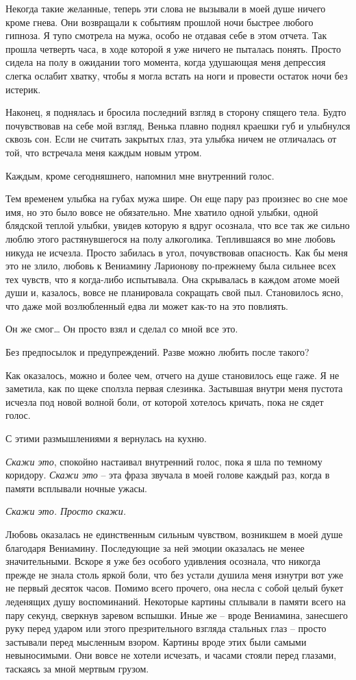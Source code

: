 \documentclass[
]{book}
\begin{document}
Некогда такие желанные, теперь эти слова не вызывали в моей душе ничего кроме гнева. Они возвращали к событиям прошлой ночи быстрее любого гипноза. Я тупо смотрела на мужа, особо не отдавая себе в этом отчета. Так прошла четверть часа, в ходе которой я уже ничего не пыталась понять. Просто сидела на полу в ожидании того момента, когда удушающая меня депрессия слегка ослабит хватку, чтобы я могла встать на ноги и провести остаток ночи без истерик.

Наконец, я поднялась и бросила последний взгляд в сторону спящего тела. Будто почувствовав на себе мой взгляд, Венька плавно поднял краешки губ и улыбнулся сквозь сон. Если не считать закрытых глаз, эта улыбка ничем не отличалась от той, что встречала меня каждым новым утром.

Каждым, кроме сегодняшнего, напомнил мне внутренний голос.

Тем временем улыбка на губах мужа шире. Он еще пару раз произнес во сне мое имя, но это было вовсе не обязательно. Мне хватило одной улыбки, одной блядской теплой улыбки, увидев которую я вдруг осознала, что все так же сильно люблю этого растянувшегося на полу алкоголика. Теплившаяся во мне любовь никуда не исчезла. Просто забилась в угол, почувствовав опасность. Как бы меня это не злило, любовь к Вениамину Ларионову по-прежнему была сильнее всех тех чувств, что я когда-либо испытывала. Она скрывалась в каждом атоме моей души и, казалось, вовсе не планировала сокращать свой пыл. Становилось ясно, что даже мой возлюбленный едва ли может как-то на это повлиять.

Он же смог\ldots{} Он просто взял и сделал со мной все это.

Без предпосылок и предупреждений. Разве можно любить после такого?

Как оказалось, можно и более чем, отчего на душе становилось еще гаже. Я не заметила, как по щеке сползла первая слезинка. Застывшая внутри меня пустота исчезла под новой волной боли, от которой хотелось кричать, пока не сядет голос.

С этими размышлениями я вернулась на кухню.

\emph{Скажи это}, спокойно настаивал внутренний голос, пока я шла по темному коридору. \emph{Скажи это} -- эта фраза звучала в моей голове каждый раз, когда в памяти всплывали ночные ужасы.

\emph{Скажи это. Просто скажи.}

Любовь оказалась не единственным сильным чувством, возникшем в моей душе благодаря Вениамину. Последующие за ней эмоции оказалась не менее значительными. Вскоре я уже без особого удивления осознала, что никогда прежде не знала столь яркой боли, что без устали душила меня изнутри вот уже не первый десяток часов. Помимо всего прочего, она несла с собой целый букет леденящих душу воспоминаний. Некоторые картины сплывали в памяти всего на пару секунд, сверкнув заревом вспышки. Иные же -- вроде Вениамина, занесшего руку перед ударом или этого презрительного взгляда стальных глаз -- просто застывали перед мысленным взором. Картины вроде этих были самыми невыносимыми. Они вовсе не хотели исчезать, и часами стояли перед глазами, таскаясь за мной мертвым грузом.
\end{document}
